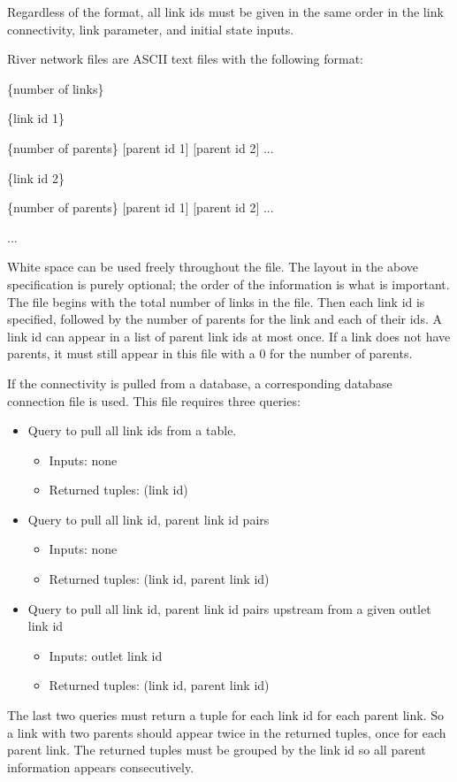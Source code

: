 \documentclass[12pt]{article}
\newenvironment{codeindent}
{\begin{list}{}
        {\setlength{\leftmargin}{.1in}}
        \item[]
}
{\end{list}}
\begin{document}
Regardless of the format, all link ids must be given in the same order in the link connectivity, link parameter, and initial state inputs.

River network files are ASCII text files with the following format:
\begin{codeindent}
 \{number of links\}
 
 \{link id 1\}
 
 \{number of parents\} [parent id 1] [parent id 2] ...
 
 \{link id 2\}
 
 \{number of parents\} [parent id 1] [parent id 2] ...
 
 ...
\end{codeindent}
White space can be used freely throughout the file. The layout in the above specification is purely optional; the order of the information is what is important. The file begins with the total number of links in the file. Then each link id is specified, followed by the number of parents for the link and each of their ids. A link id can appear in a list of parent link ids at most once. If a link does not have parents, it must still appear in this file with a 0 for the number of parents.

If the connectivity is pulled from a database, a corresponding database connection file is used. This file requires three queries:
\begin{itemize}
 \item Query to pull all link ids from a table. 
  \begin{itemize}
   \item Inputs: none
   \item Returned tuples: (link id)
  \end{itemize}
 \item Query to pull all link id, parent link id pairs
  \begin{itemize}
   \item Inputs: none
   \item Returned tuples: (link id, parent link id)
  \end{itemize}
 \item Query to pull all link id, parent link id pairs upstream from a given outlet link id
  \begin{itemize}
   \item Inputs: outlet link id
   \item Returned tuples: (link id, parent link id)
  \end{itemize}
\end{itemize}
The last two queries must return a tuple for each link id for each parent link. So a link with two parents should appear twice in the returned tuples, once for each parent link. The returned tuples must be grouped by the link id so all parent information appears consecutively.
\end{document}
